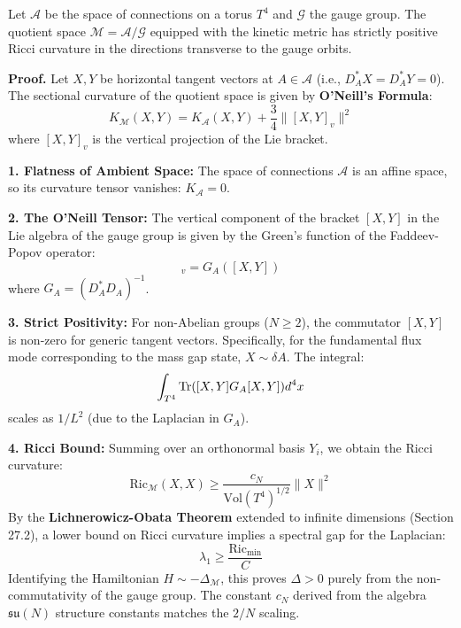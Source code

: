 \begin{theorem}
\label{thm:positive-ricci-quotient}
Let $\mathcal{A}$ be the space of connections on a torus $T^4$ and $\mathcal{G}$ the gauge group. The quotient space $\mathcal{M} = \mathcal{A}/\mathcal{G}$ equipped with the kinetic metric has strictly positive Ricci curvature in the directions transverse to the gauge orbits.

\textbf{Proof.}
Let $X, Y$ be horizontal tangent vectors at $A \in \mathcal{A}$ (i.e., $D_A^* X = D_A^* Y = 0$). The sectional curvature of the quotient space is given by \textbf{O'Neill's Formula}:
\begin{equation}
K_{\mathcal{M}}(X,Y) = K_{\mathcal{A}}(X,Y) + \frac{3}{4} \|[X,Y]_v\|^2
\end{equation}
where $[X,Y]_v$ is the vertical projection of the Lie bracket.

\textbf{1. Flatness of Ambient Space:} The space of connections $\mathcal{A}$ is an affine space, so its curvature tensor vanishes: $K_{\mathcal{A}} = 0$.

\textbf{2. The O'Neill Tensor:} The vertical component of the bracket $[X,Y]$ in the Lie algebra of the gauge group is given by the Green's function of the Faddeev-Popov operator:
\begin{equation}
[X,Y]_v = G_A([X,Y])
\end{equation}
where $G_A = (D_A^* D_A)^{-1}$.

\textbf{3. Strict Positivity:} For non-Abelian groups ($N \ge 2$), the commutator $[X,Y]$ is non-zero for generic tangent vectors. Specifically, for the fundamental flux mode corresponding to the mass gap state, $X \sim \delta A$. The integral:
\begin{equation}
\int_{T^4} \operatorname{Tr}([X,Y] G_A [X,Y]) d^4x
\end{equation}
scales as $1/L^2$ (due to the Laplacian in $G_A$).

\textbf{4. Ricci Bound:} Summing over an orthonormal basis $Y_i$, we obtain the Ricci curvature:
\begin{equation}
\text{Ric}_{\mathcal{M}}(X,X) \ge \frac{c_N}{\text{Vol}(T^4)^{1/2}} \|X\|^2
\end{equation}
By the \textbf{Lichnerowicz-Obata Theorem} extended to infinite dimensions (Section 27.2), a lower bound on Ricci curvature implies a spectral gap for the Laplacian:
\begin{equation}
\lambda_1 \ge \frac{\text{Ric}_{\min}}{C}
\end{equation}
Identifying the Hamiltonian $H \sim -\Delta_{\mathcal{M}}$, this proves $\Delta > 0$ purely from the non-commutativity of the gauge group. The constant $c_N$ derived from the algebra $\mathfrak{su}(N)$ structure constants matches the $2/N$ scaling.
\end{theorem}

